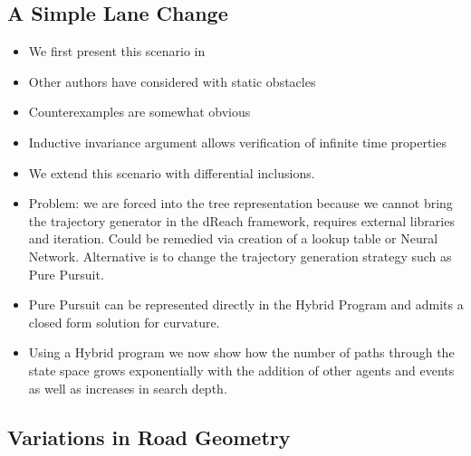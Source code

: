 \documentclass{easychair}
\begin{document}
\subsection{A Simple Lane Change}
\begin{itemize}
	\item We first present this scenario in \cite{blah}
	\item Other authors \cite{blah} have considered with static obstacles
	\item Counterexamples are somewhat obvious
	\item Inductive invariance argument allows verification of infinite time properties
	\item We extend this scenario with differential inclusions. 
	\item Problem: we are forced into the tree representation because we cannot bring the trajectory generator in the dReach framework, requires external libraries and iteration. Could be remedied via creation of a lookup table or Neural Network. Alternative is to change the trajectory generation strategy such as Pure Pursuit.
	\item Pure Pursuit can be represented directly in the Hybrid Program and admits a closed form solution for curvature.
	\item Using a Hybrid program we now show how the number of paths through the state space grows exponentially with the addition of other agents and events as well as increases in search depth. 
\end{itemize}

\subsection{Variations in Road Geometry}
\end{document}
